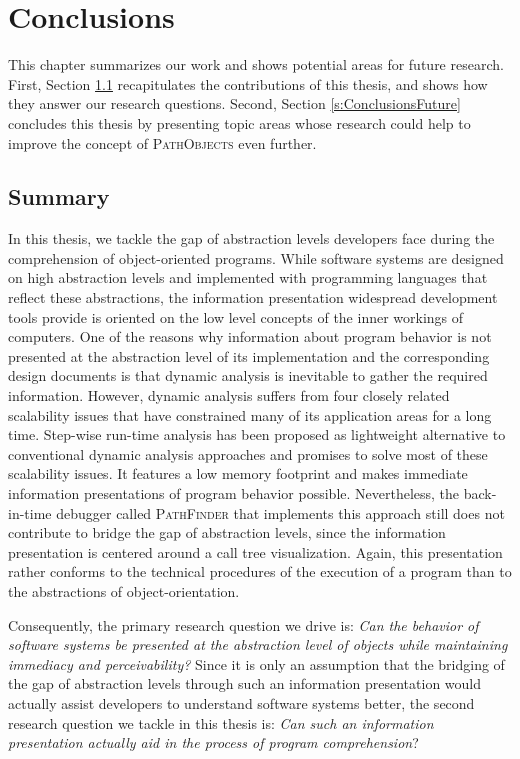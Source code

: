 \chapter{Conclusions}
\label{c:conclusions}
This chapter summarizes our work and shows potential areas for future research.
First, Section \ref{s:ConclusionsSummary} recapitulates the contributions of this thesis, and shows how they answer our research questions.
Second, Section \ref{s:ConclusionsFuture} concludes this thesis by presenting topic areas whose research could help to improve the concept of \textsc{PathObjects} even further. 

\section{Summary}
\label{s:ConclusionsSummary}
In this thesis, we tackle the gap of abstraction levels developers face during the comprehension of object-oriented programs.
While software systems are designed on high abstraction levels and implemented with programming languages that reflect these abstractions, the information presentation widespread development tools provide is oriented on the low level concepts of the inner workings of computers.
One of the reasons why information about program behavior is not presented at the abstraction level of its implementation and the corresponding design documents is that dynamic analysis is inevitable to gather the required information.
However, dynamic analysis suffers from four closely related scalability issues that have constrained many of its application areas for a long time.
Step-wise run-time analysis has been proposed as lightweight alternative to conventional dynamic analysis approaches and promises to solve most of these scalability issues.
It features a low memory footprint and makes immediate information presentations of program behavior possible.
Nevertheless, the back-in-time debugger called \textsc{PathFinder} that implements this approach still does not contribute to bridge the gap of abstraction levels, since the information presentation is centered around a call tree visualization.
Again, this presentation rather conforms to the technical procedures of the execution of a program than to the abstractions of object-orientation.

Consequently, the primary research question we drive is: \textit{Can the behavior of software systems be presented at the abstraction level of objects while maintaining immediacy and perceivability?}
Since it is only an assumption that the bridging of the gap of abstraction levels through such an information presentation would actually assist developers to understand software systems  better, the second research question we tackle in this thesis is:
\textit{Can such an information presentation actually aid in the process of program comprehension}?

